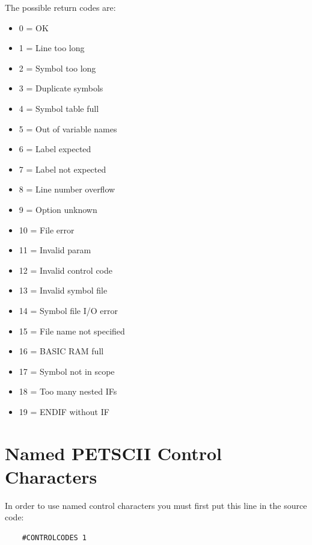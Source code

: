 \documentclass{article}
\begin{document}
        The possible return codes are:

        \begin{itemize}
            \item 0 = OK
            \item 1 = Line too long
            \item 2 = Symbol too long
            \item 3 = Duplicate symbols
            \item 4 = Symbol table full
            \item 5 = Out of variable names
            \item 6 = Label expected
            \item 7 = Label not expected
            \item 8 = Line number overflow
            \item 9 = Option unknown
            \item 10 = File error
            \item 11 = Invalid param
            \item 12 = Invalid control code
            \item 13 = Invalid symbol file
            \item 14 = Symbol file I/O error
            \item 15 = File name not specified
            \item 16 = BASIC RAM full
            \item 17 = Symbol not in scope
            \item 18 = Too many nested IFs
            \item 19 = ENDIF without IF
        \end{itemize}

\appendix
\newpage
\section{Named PETSCII Control Characters}
    
    In order to use named control characters you must first
    put this line in the source code:

    \begin{verbatim}
    #CONTROLCODES 1
    \end{verbatim}
\end{document}
